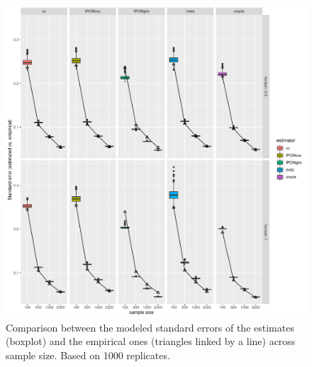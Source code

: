 \documentclass[12pt]{article}
\begin{document}
\begin{figure}[!h]
\centering
\includegraphics[width=\textwidth]{./figures/simStudy-bin-sd.pdf}
\caption{\label{fig:simulationBinarySD}Comparison between the modeled standard errors of the estimates (boxplot) and the empirical ones (triangles linked by a line) across sample size. Based on 1000 replicates.}
\end{figure}
\end{document}
